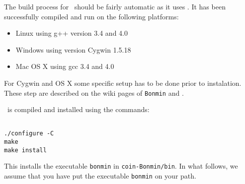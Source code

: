 \begin{PageSummary}
\end{PageSummary}

\begin{quickref}
\end{quickref}
The build process for \Bonmin\ should be fairly automatic as it uses
.
  It has been successfully compiled and run on the following platforms:
\begin{itemize}
\item Linux using g++ version 3.4 and 4.0
\item Windows using version Cygwin 1.5.18
\item Mac OS X using gcc 3.4 and 4.0
\end{itemize}

For Cygwin and OS X some specific setup has to be done prior to instalation. These step are described on the wiki pages of {\tt Bonmin}   and .


\Bonmin\ is compiled and installed using the commands:
\begin{colorverb}
\begin{verbatim}

./configure -C
make
make install

\end{verbatim}
\end{colorverb}

This installs the executable {\tt bonmin} in {\tt coin-Bonmin/bin}. In what follows, we assume
that you have put the executable {\tt bonmin} on your path.

